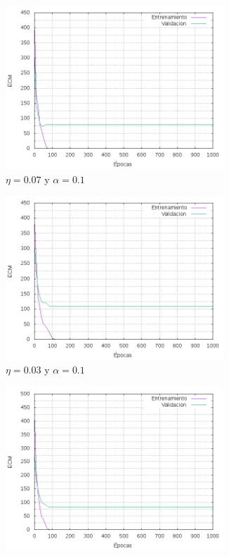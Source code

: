 \begin{figure}[H]
\centering
	\begin{subfigure}[b]{0.45\textwidth}
	  \includegraphics[width=0.9\textwidth]{imagenes/ej1/ex_2-1_red_11-21-1_errors.png}
	  \caption{$\eta = 0.07$ y $  \alpha = 0.1$}
	\end{subfigure}
	\begin{subfigure}[b]{0.45\textwidth}
	  \includegraphics[width=0.9\textwidth]{imagenes/ej1/ex_2-2_red_11-21-1_errors.png}
	  \caption{$\eta = 0.03$ y $  \alpha = 0.1$}
	\end{subfigure}
	\begin{subfigure}[b]{0.45\textwidth}
	  \includegraphics[width=0.9\textwidth]{imagenes/ej1/ex_2-3_red_11-21-1_errors.png}

\end{subfigure}
\end{figure}

